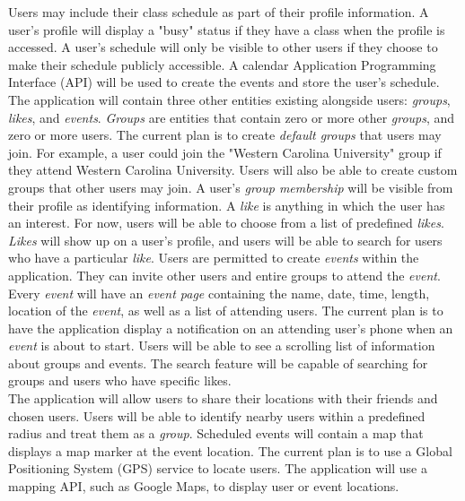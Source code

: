 \documentclass[11pt]{article}
\begin{document}
Users may include their class schedule as part of their profile information. A user's profile will display
a "busy" status if they have a class when the profile is accessed. A user's schedule will only be 
visible to other users if they choose to make their schedule publicly accessible. A calendar 
Application Programming Interface (API) will be used to create the events and store the user's schedule. \\ 

The application will contain three other entities existing alongside users: 
\textit{groups}, \textit{likes}, and \textit{events}. \textit{Groups} are entities that contain zero or more other 
\textit{groups}, and zero or more users. The current plan is to create \textit{default groups} that users may join. 
For example, a user could join the "Western Carolina University" group if they attend Western 
Carolina University. Users will also be able to create custom groups that other users may join.
A user's \textit{group membership} will be visible from their profile as identifying 
information. A \textit{like} is anything in which the user has an interest.
For now, users will be able to choose from a list of predefined
\textit{likes}. \textit{Likes} will show up on a user's profile, and users will be able to search for users who have
a particular \textit{like}. Users are permitted to create \textit{events} within the application. 
They can invite other users and entire groups to attend the \textit{event}. Every \textit{event} will have an \textit{event 
page} containing the name, date, time, length, location of the \textit{event}, as well as a list of attending users. The current 
plan is to have the application display a notification on an attending user's phone when an \textit{event} is about to 
start. Users will be able to see a scrolling list of information about groups and events. 
The search feature will be capable of searching for groups and users who have specific likes. \\


The application will allow users to share their locations with their friends and chosen users. Users
will be able to identify nearby users within a predefined radius and treat them as a \textit{group}. 
Scheduled events will contain a map that displays a map marker at the event location. 
The current plan is to use a Global Positioning System (GPS) service to locate users. The application 
will use a mapping API, such as Google Maps, to display user or event locations. \\
\end{document}
